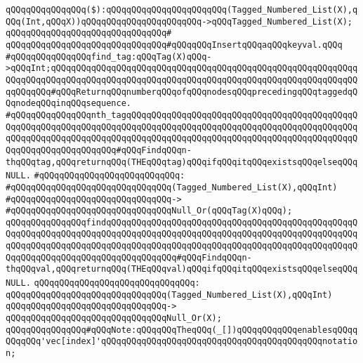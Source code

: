 \verb|qQQqqQQqqQQqqQQq($):qQQqqQQqqQQqqQQqqQQqqQQq(Tagged_Numbered_List(X),qQQq(Int,qQQqX))qQQqqQQqqQQqqQQqqQQqqQQq->qQQqTagged_Numbered_List(X);|\newline
\verb|qQQqqQQqqQQqqQQqqQQqqQQqqQQqqQQq#|\newline
\verb|qQQqqQQqqQQqqQQqqQQqqQQqqQQqqQQq#qQQqqQQqInsertqQQqaqQQqkeyval.qQQq|\newline
\newline
\verb|#qQQqqQQqqQQqqQQqfind_tag:qQQqTag(X)qQQq->qQQqInt;qQQqqQQqqQQqqQQqqQQqqQQqqQQqqQQqqQQqqQQqqQQqqQQqqQQqqQQqqQQqqQQqqQQqqQQqqQQqqQQqqQQqqQQqqQQqqQQqqQQqqQQqqQQqqQQqqQQqqQQqqQQqqQQqqQQqqQQqqQQq#qQQqReturnqQQqnumberqQQqofqQQqnodesqQQqprecedingqQQqtaggedqQQqnodeqQQqinqQQqsequence.|\newline
\newline
\verb|#qQQqqQQqqQQqqQQqnth_tagqQQqqQQqqQQqqQQqqQQqqQQqqQQqqQQqqQQqqQQqqQQqqQQqqQQqqQQqqQQqqQQqqQQqqQQqqQQqqQQqqQQqqQQqqQQqqQQqqQQqqQQqqQQqqQQqqQQqqQQqqQQqqQQqqQQqqQQqqQQqqQQqqQQqqQQqqQQqqQQqqQQqqQQqqQQqqQQqqQQqqQQqqQQqqQQqqQQqqQQqqQQqqQQq#qQQqFindqQQqn-thqQQqtag,qQQqreturnqQQq(THEqQQqtag)qQQqifqQQqitqQQqexistsqQQqelseqQQqNULL.|\newline
\verb|#qQQqqQQqqQQqqQQqqQQqqQQqqQQq:|\newline
\verb|#qQQqqQQqqQQqqQQqqQQqqQQqqQQqqQQq(Tagged_Numbered_List(X),qQQqInt)|\newline
\verb|#qQQqqQQqqQQqqQQqqQQqqQQqqQQqqQQq->|\newline
\verb|#qQQqqQQqqQQqqQQqqQQqqQQqqQQqqQQqNull_Or(qQQqTag(X)qQQq);|\newline
\newline
\verb|qQQqqQQqqQQqqQQqfindqQQqqQQqqQQqqQQqqQQqqQQqqQQqqQQqqQQqqQQqqQQqqQQqqQQqqQQqqQQqqQQqqQQqqQQqqQQqqQQqqQQqqQQqqQQqqQQqqQQqqQQqqQQqqQQqqQQqqQQqqQQqqQQqqQQqqQQqqQQqqQQqqQQqqQQqqQQqqQQqqQQqqQQqqQQqqQQqqQQqqQQqqQQqqQQqqQQqqQQqqQQqqQQqqQQqqQQqqQQqqQQq#qQQqFindqQQqn-thqQQqval,qQQqreturnqQQq(THEqQQqval)qQQqifqQQqitqQQqexistsqQQqelseqQQqNULL.|\newline
\verb|qQQqqQQqqQQqqQQqqQQqqQQqqQQqqQQq:|\newline
\verb|qQQqqQQqqQQqqQQqqQQqqQQqqQQqqQQq(Tagged_Numbered_List(X),qQQqInt)|\newline
\verb|qQQqqQQqqQQqqQQqqQQqqQQqqQQqqQQq->|\newline
\verb|qQQqqQQqqQQqqQQqqQQqqQQqqQQqqQQqNull_Or(X);|\newline
\newline
\verb|qQQqqQQqqQQqqQQq#qQQqNote:qQQqqQQqTheqQQq(_[])qQQqqQQqqQQqenablesqQQqqQQqqQQq'vec[index]'qQQqqQQqqQQqqQQqqQQqqQQqqQQqqQQqqQQqqQQqqQQqnotation;|\newline
